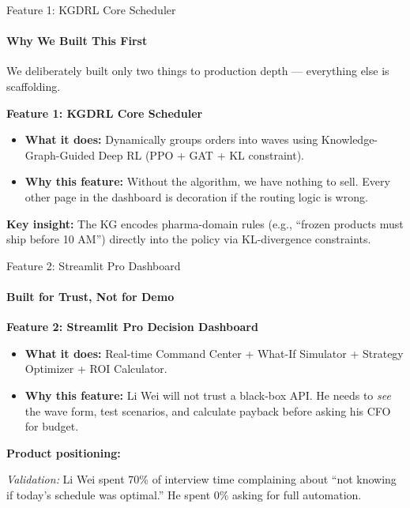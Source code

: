 \documentclass{beamer}
\begin{document}
\begin{frame}{Feature 1: KGDRL Core Scheduler}
  \framesubtitle{Why We Built This First}
  \small

  We deliberately built only two things to production depth --- everything else is scaffolding.

  \vspace{0.3cm}
  \textbf{\color{UBCblue}Feature 1: KGDRL Core Scheduler}
  \begin{itemize}
    \item \textbf{What it does:} Dynamically groups orders into waves using Knowledge-Graph-Guided Deep RL (PPO + GAT + KL constraint).
    \item \textbf{Why this feature:} Without the algorithm, we have nothing to sell. Every other page in the dashboard is decoration if the routing logic is wrong.
  \end{itemize}

  \vspace{0.2cm}
  \textbf{Key insight:} The KG encodes pharma-domain rules (e.g., ``frozen products must ship before 10 AM'') directly into the policy via KL-divergence constraints.
\end{frame}

\begin{frame}{Feature 2: Streamlit Pro Dashboard}
  \framesubtitle{Built for Trust, Not for Demo}
  \small

  \textbf{\color{UBCblue}Feature 2: Streamlit Pro Decision Dashboard}
  \begin{itemize}
    \item \textbf{What it does:} Real-time Command Center + What-If Simulator + Strategy Optimizer + ROI Calculator.
    \item \textbf{Why this feature:} Li Wei will not trust a black-box API. He needs to \textit{see} the wave form, test scenarios, and calculate payback before asking his CFO for budget.
  \end{itemize}

  \vspace{0.2cm}
  \textbf{Product positioning:}
  \begin{center}
  \end{center}

  \textit{Validation:} Li Wei spent 70\% of interview time complaining about ``not knowing if today's schedule was optimal.'' He spent 0\% asking for full automation.
\end{frame}
\end{document}
